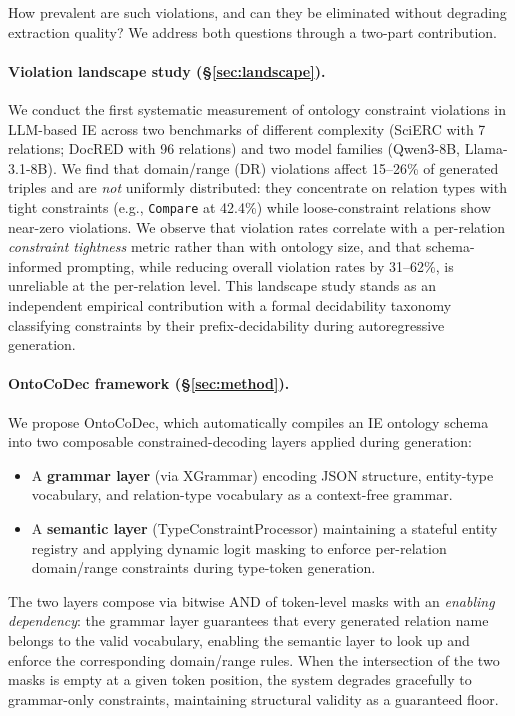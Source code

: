 \documentclass[11pt,a4paper]{article}
\newcommand{\sys}{OntoCoDec\xspace}
\begin{document}
How prevalent are such violations, and can they be eliminated without degrading extraction quality?
We address both questions through a two-part contribution.

\paragraph{Violation landscape study (\S\ref{sec:landscape}).}
We conduct the first systematic measurement of ontology constraint violations in LLM-based IE across two benchmarks of different complexity (SciERC with 7 relations; DocRED with 96 relations) and two model families (Qwen3-8B, Llama-3.1-8B).
We find that domain/range (DR) violations affect 15--26\% of generated triples and are \emph{not} uniformly distributed: they concentrate on relation types with tight constraints (e.g., \texttt{Compare} at 42.4\%) while loose-constraint relations show near-zero violations.
We observe that violation rates correlate with a per-relation \emph{constraint tightness} metric rather than with ontology size, and that schema-informed prompting, while reducing overall violation rates by 31--62\%, is unreliable at the per-relation level.
This landscape study stands as an independent empirical contribution with a formal decidability taxonomy classifying constraints by their prefix-decidability during autoregressive generation.

\paragraph{OntoCoDec framework (\S\ref{sec:method}).}
We propose \sys, which automatically compiles an IE ontology schema into two composable constrained-decoding layers applied during generation:
\begin{itemize}[nosep]
    \item A \textbf{grammar layer} (via XGrammar) encoding JSON structure, entity-type vocabulary, and relation-type vocabulary as a context-free grammar.
    \item A \textbf{semantic layer} (TypeConstraintProcessor) maintaining a stateful entity registry and applying dynamic logit masking to enforce per-relation domain/range constraints during type-token generation.
\end{itemize}
The two layers compose via bitwise AND of token-level masks with an \emph{enabling dependency}: the grammar layer guarantees that every generated relation name belongs to the valid vocabulary, enabling the semantic layer to look up and enforce the corresponding domain/range rules.
When the intersection of the two masks is empty at a given token position, the system degrades gracefully to grammar-only constraints, maintaining structural validity as a guaranteed floor.
\end{document}
